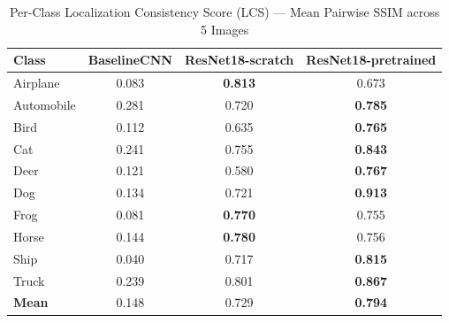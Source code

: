 \begin{table}[h]
\centering
\caption{Per-Class Localization Consistency Score (LCS) — Mean Pairwise SSIM across 5 Images}
\label{tab:lcs_per_class}
\begin{tabular}{lccc}
\hline
\textbf{Class} & \textbf{BaselineCNN} & \textbf{ResNet18-scratch} & \textbf{ResNet18-pretrained} \\
\hline
Airplane & 0.083 & \textbf{0.813} & 0.673 \\
Automobile & 0.281 & 0.720 & \textbf{0.785} \\
Bird & 0.112 & 0.635 & \textbf{0.765} \\
Cat & 0.241 & 0.755 & \textbf{0.843} \\
Deer & 0.121 & 0.580 & \textbf{0.767} \\
Dog & 0.134 & 0.721 & \textbf{0.913} \\
Frog & 0.081 & \textbf{0.770} & 0.755 \\
Horse & 0.144 & \textbf{0.780} & 0.756 \\
Ship & 0.040 & 0.717 & \textbf{0.815} \\
Truck & 0.239 & 0.801 & \textbf{0.867} \\
\hline
\textbf{Mean} & 0.148 & 0.729 & \textbf{0.794} \\
\hline
\end{tabular}
\end{table}
